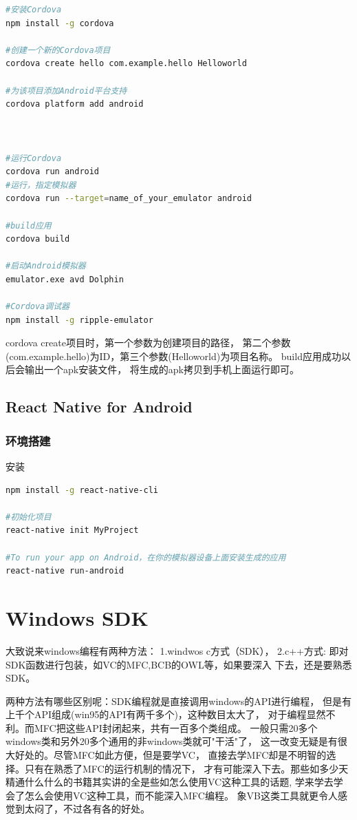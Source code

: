 \documentclass{book}
\begin{document}
\begin{lstlisting}[language=Bash]
#安装Cordova
npm install -g cordova

#创建一个新的Cordova项目
cordova create hello com.example.hello Helloworld

#为该项目添加Android平台支持
cordova platform add android



#运行Cordova
cordova run android
#运行，指定模拟器
cordova run --target=name_of_your_emulator android

#build应用
cordova build

#启动Android模拟器
emulator.exe avd Dolphin

#Cordova调试器
npm install -g ripple-emulator
\end{lstlisting}

cordova create项目时，第一个参数为创建项目的路径，
第二个参数(com.example.hello)为ID，第三个参数(Helloworld)为项目名称。
build应用成功以后会输出一个apk安装文件，
将生成的apk拷贝到手机上面运行即可。

\section{React Native for Android}

\subsection{环境搭建}

安装

\begin{lstlisting}[language=Bash]
npm install -g react-native-cli

#初始化项目
react-native init MyProject

#To run your app on Android，在你的模拟器设备上面安装生成的应用
react-native run-android
\end{lstlisting}

\chapter{Windows SDK}

大致说来windows编程有两种方法： 1.windwos c方式（SDK）， 2.c++方式:
即对SDK函数进行包装，如VC的MFC,BCB的OWL等，如果要深入 下去，还是要熟悉SDK。

两种方法有哪些区别呢：SDK编程就是直接调用windows的API进行编程，
但是有上千个API组成(win95的API有两千多个)，这种数目太大了，
对于编程显然不利。而MFC把这些API封闭起来，共有一百多个类组成。
一般只需20多个windows类和另外20多个通用的非windows类就可"干活"了，
这一改变无疑是有很大好处的。尽管MFC如此方便，但是要学VC，
直接去学MFC却是不明智的选择。只有在熟悉了MFC的运行机制的情况下，
才有可能深入下去。那些如多少天精通什么什么的书籍其实讲的全是些如怎么使用VC这种工具的话题,
学来学去学会了怎么会使用VC这种工具，而不能深入MFC编程。
象VB这类工具就更令人感觉到太闷了，不过各有各的好处。
\end{document}
